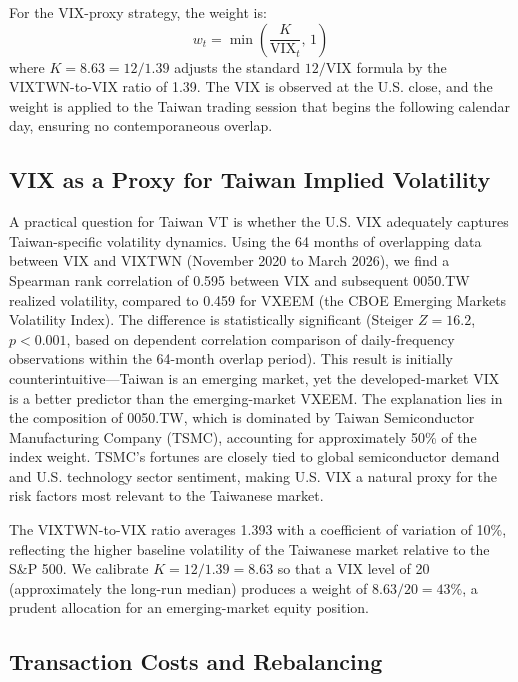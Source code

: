 For the VIX-proxy strategy, the weight is:
\begin{equation}
w_t = \min\!\left(\frac{K}{\text{VIX}_t}, \, 1\right)
\label{eq:vix_vt}
\end{equation}
where $K = 8.63 = 12 / 1.39$ adjusts the standard $12/\text{VIX}$ formula \citep{bozovic2024} by the VIXTWN-to-VIX ratio of 1.39. The VIX is observed at the U.S. close, and the weight is applied to the Taiwan trading session that begins the following calendar day, ensuring no contemporaneous overlap.

\subsection{VIX as a Proxy for Taiwan Implied Volatility}

A practical question for Taiwan VT is whether the U.S. VIX adequately captures Taiwan-specific volatility dynamics. Using the 64 months of overlapping data between VIX and VIXTWN (November 2020 to March 2026), we find a Spearman rank correlation of 0.595 between VIX and subsequent 0050.TW realized volatility, compared to 0.459 for VXEEM (the CBOE Emerging Markets Volatility Index). The difference is statistically significant (Steiger $Z = 16.2$, $p < 0.001$, based on dependent correlation comparison of daily-frequency observations within the 64-month overlap period). This result is initially counterintuitive---Taiwan is an emerging market, yet the developed-market VIX is a better predictor than the emerging-market VXEEM. The explanation lies in the composition of 0050.TW, which is dominated by Taiwan Semiconductor Manufacturing Company (TSMC), accounting for approximately 50\% of the index weight. TSMC's fortunes are closely tied to global semiconductor demand and U.S. technology sector sentiment, making U.S. VIX a natural proxy for the risk factors most relevant to the Taiwanese market.

The VIXTWN-to-VIX ratio averages 1.393 with a coefficient of variation of 10\%, reflecting the higher baseline volatility of the Taiwanese market relative to the S\&P 500. We calibrate $K = 12 / 1.39 = 8.63$ so that a VIX level of 20 (approximately the long-run median) produces a weight of $8.63/20 = 43\%$, a prudent allocation for an emerging-market equity position.

\subsection{Transaction Costs and Rebalancing}

